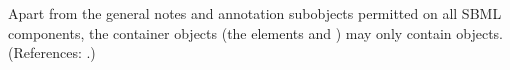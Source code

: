 Apart from the general notes and annotation subobjects permitted on all
SBML components, the \ListOfSpeciesReferences container objects (\ie the
\Reaction elements  and ) may
only contain \SpeciesReference objects.  (References: .)
